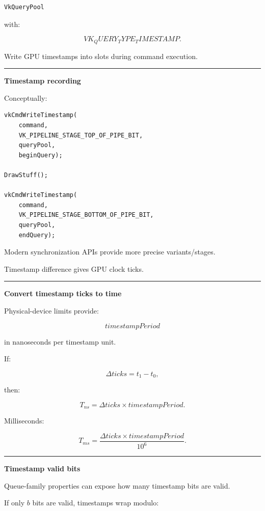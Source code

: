 \begin{verbatim}
VkQueryPool
\end{verbatim}

with:

\[
VK_QUERY_TYPE_TIMESTAMP.
\]

Write GPU timestamps into slots during command execution.

\begin{center}\rule{0.5\linewidth}{0.5pt}\end{center}

\textbf{Timestamp recording}

Conceptually:

\begin{verbatim}
vkCmdWriteTimestamp(
    command,
    VK_PIPELINE_STAGE_TOP_OF_PIPE_BIT,
    queryPool,
    beginQuery);

DrawStuff();

vkCmdWriteTimestamp(
    command,
    VK_PIPELINE_STAGE_BOTTOM_OF_PIPE_BIT,
    queryPool,
    endQuery);
\end{verbatim}

Modern synchronization APIs provide more precise variants/stages.

Timestamp difference gives GPU clock ticks.

\begin{center}\rule{0.5\linewidth}{0.5pt}\end{center}

\textbf{Convert timestamp ticks to time}

Physical-device limits provide:

\[
timestampPeriod
\]

in nanoseconds per timestamp unit.

If:

\[
\Delta ticks=
t_1-t_0,
\]

then:

\[
\boxed{
T_{ns}
=
\Delta ticks
\times
timestampPeriod.
}
\]

Milliseconds:

\[
T_{ms}
=
\frac{
\Delta ticks\times timestampPeriod
}{
10^6
}.
\]

\begin{center}\rule{0.5\linewidth}{0.5pt}\end{center}

\textbf{Timestamp valid bits}

Queue-family properties can expose how many timestamp bits are valid.

If only \(b\) bits are valid, timestamps wrap modulo:

